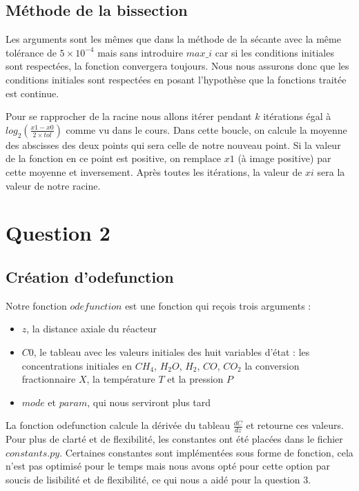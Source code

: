 \documentclass[11pt]{report}
\newcommand{\mychapter}[2]{
    \setcounter{chapter}{#1}
    \setcounter{section}{0}
    \chapter*{#2}
    \addcontentsline{toc}{chapter}{#2}
}
\begin{document}
        \section{Méthode de la bissection}
        Les arguments sont les mêmes que dans la méthode de la sécante avec la même tolérance de $5\times10^{-4}$ mais sans introduire $max\_i$
        car si les conditions initiales sont respectées, la fonction convergera toujours.
        Nous nous assurons donc que les conditions initiales sont respectées en posant l'hypothèse que la fonctions traitée est continue.
        \par
        Pour se rapprocher de la racine nous allons itérer pendant $k$ itérations égal à\\
        $log_2(\frac{x1-x0}{2{\times}tol})$ comme vu dans le cours.
        Dans cette boucle, on calcule la moyenne des abscisses des deux points qui sera celle de notre nouveau point.
        Si la valeur de la fonction en ce point est positive, on remplace $x1$ (à image positive) par cette moyenne et inversement.
        Après toutes les itérations, la valeur de $xi$ sera la valeur de notre racine.

    \mychapter{2}{Question 2}
        \section{Création d'odefunction}
        Notre fonction $odefunction$ est une fonction qui reçois trois arguments :
        \begin{itemize}
            \item $z$, la distance axiale  du réacteur
            \item $C0$, le tableau avec les valeurs initiales des huit variables d'état :
                  les concentrations initiales en $CH_4$, $H_2O$, $H_2$, $CO$, $CO_2$
                  la conversion fractionnaire $X$,
                  la température $T$
                  et la pression $P$
            \item $mode$ et $param$, qui nous serviront plus tard
        \end{itemize}
        La fonction odefunction calcule la dérivée du tableau $\frac{dC}{dz}$ et retourne ces valeurs.
        Pour plus de clarté et de flexibilité, les constantes ont été placées dans le fichier $constants.py$.
        Certaines constantes sont implémentées sous forme de fonction,
        cela n'est pas optimisé pour le temps mais nous avons opté pour cette option par soucis de lisibilité
        et de flexibilité, ce qui nous a aidé pour la question 3.
\end{document}
